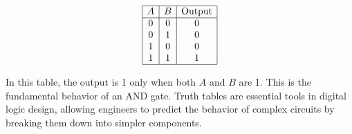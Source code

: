 \[
\begin{array}{|c|c|c|}
\hline
A & B & \text{Output} \\
\hline
0 & 0 & 0 \\
0 & 1 & 0 \\
1 & 0 & 0 \\
1 & 1 & 1 \\
\hline
\end{array}
\]

In this table, the output is 1 only when both \( A \) and \( B \) are 1. This is the fundamental behavior of an AND gate. Truth tables are essential tools in digital logic design, allowing engineers to predict the behavior of complex circuits by breaking them down into simpler components.

